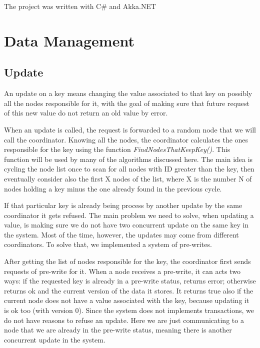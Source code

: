 \documentclass[12pt, a4paper]{article}
\begin{document}
    The project was written with C\# and Akka.NET

    \pagebreak
    \section{Data Management}
    \subsection{Update}
    An update on a key means changing the value associated to that key on possibly all the nodes responsible for it, with the goal of making sure that future request of this new value do not return an old value by error. 

    When an update is called, the request is forwarded to a random node that we will call the coordinator. Knowing all the nodes, the coordinator calculates the ones responsible for the key using the function \textit{FindNodesThatKeepKey()}. This function will be used by many of the algorithms discussed here. The main idea is cycling the node list once to scan for all nodes with ID greater than the key, then eventually consider also the first X nodes of the list, where X is the number N of nodes holding a key minus the one already found in the previous cycle.

    If that particular key is already being process by another update by the same coordinator it gets refused. The main problem we need to solve, when updating a value, is making sure we do not have two concurrent update on the same key in the system. Most of the time, however, the updates may come from different coordinators. To solve that, we implemented a system of pre-writes.

    After getting the list of nodes responsible for the key, the coordinator first sends requests of pre-write for it. When a node receives a pre-write, it can acts two ways: if the requested key is already in a pre-write status, returns error; otherwise returns ok and the current version of the data it stores. It returns true also if the current node does not have a value associated with the key, because updating it is ok too (with version 0). Since the system does not implements transactions, we do not have reasons to refuse an update. Here we are just communicating to a node that we are already in the pre-write status, meaning there is another concurrent update in the system.
\end{document}
